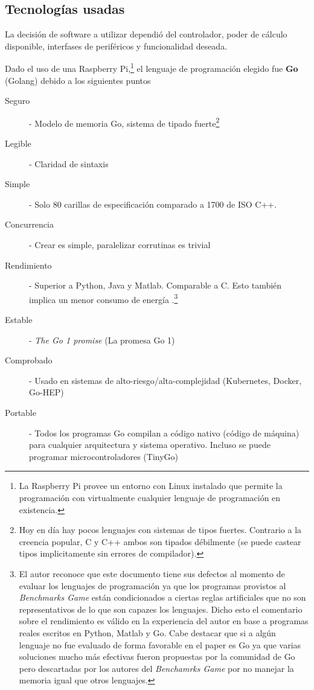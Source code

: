 \subsection{Tecnologías usadas}

La decisión de software a utilizar dependió del controlador, poder de cálculo disponible, interfases de periféricos y funcionalidad deseada.

\medskip

Dado el uso de una Raspberry Pi,\footnote{La Raspberry Pi provee un entorno con Linux instalado que permite la programación con virtualmente cualquier lenguaje de programación en existencia.} el lenguaje de programación elegido fue \textbf{Go} (Golang) debido a los siguientes puntos

\begin{description}
    \item[Seguro] - Modelo de memoria Go, sistema de tipado fuerte\footnote{Hoy en día hay pocos lenguajes con sistemas de tipos fuertes. Contrario a la creencia popular, C y C++ ambos son tipados débilmente (se puede castear tipos implicitamente sin errores de compilador).}
    \item[Legible] - Claridad de sintaxis 
    \item[Simple] - Solo 80 carillas de especificación comparado a 1700 de ISO C++.
    \item[Concurrencia] - Crear  es simple, paralelizar corrutinas es trivial
    \item[Rendimiento] - Superior a Python, Java y Matlab. Comparable a C. Esto también implica un menor consumo de energía \citep{pythonIsSlow}.\footnote{El autor reconoce que este documento tiene sus defectos al momento de evaluar los lenguajes de programación ya que los programas provistos al \textit{Benchmarks Game} están condicionados a ciertas reglas artificiales que no son representativos de lo que son capazes los lenguajes. Dicho esto el comentario sobre el rendimiento es válido en la experiencia del autor en base a programas reales escritos en Python, Matlab y Go. Cabe destacar que si a algún lenguaje no fue evaluado de forma favorable en el paper es Go ya que varias soluciones mucho más efectivas fueron propuestas por la comunidad de Go pero descartadas por los autores del \textit{Benchamrks Game} por no manejar la memoria igual que otros lenguajes.}
    \item[Estable] - \textit{The Go 1 promise} (La promesa Go 1)
    \item[Comprobado] -  Usado en sistemas de alto-riesgo/alta-complejidad (Kubernetes, Docker, Go-HEP)
    \item[Portable] - Todos los programas Go compilan a código nativo (código de máquina) para cualquier arquitectura y sistema operativo. Incluso se puede programar microcontroladores (TinyGo)
\end{description}


